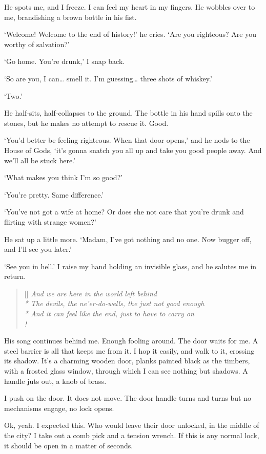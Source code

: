 He spots me, and I freeze. I can feel my heart in my fingers. He
wobbles over to me, brandishing a brown bottle in his fist.

`Welcome! Welcome to the end of history!' he cries. `Are you
righteous? Are you worthy of salvation?'

`Go home. You're drunk,' I snap back.

`So are you, I can… smell it. I'm guessing… three shots of whiskey.'

`Two.'

He half-sits, half-collapses to the ground. The bottle in his hand
spills onto the stones, but he makes no attempt to rescue it. Good.

`You'd better be feeling righteous. When that door opens,' and he
nods to the House of Gods, `it's gonna snatch you all up and take you
good people away. And we'll all be stuck here.'

`What makes you think I'm so good?'

`You're pretty. Same difference.'

`You've not got a wife at home? Or does she not care that you're drunk
and flirting with strange women?'

He sat up a little more. `Madam, I've got nothing and no one. Now
bugger off, and I'll see you later.'

`See you in hell.' I raise my hand holding an invisible glass, and he
salutes me in return.
\allowbreak
\settowidth{\versewidth}{The devils, the ne'er-do-wells, the just not good enough}
\begin{verse}[\versewidth]\it
	And we are here in the world left behind\\*
	The devils, the ne'er-do-wells, the just not good enough\\*
	And it can feel like the end, just to have to carry on\\!
\end{verse}

His song continues behind me. Enough fooling around. The door waits
for me. A steel barrier is all that keeps me from it. I hop it easily,
and walk to it, crossing its shadow. It's a charming wooden door,
planks painted black as the timbers, with a frosted glass window,
through which I can see nothing but shadows. A handle juts out, a knob
of brass.

I push on the door. It does not move. The door handle turns and turns
but no mechanisms engage, no lock opens.

Ok, yeah. I expected this. Who would leave their door unlocked, in the
middle of the city? I take out a comb pick and a tension wrench. If
this is any normal lock, it should be open in a matter of seconds.

